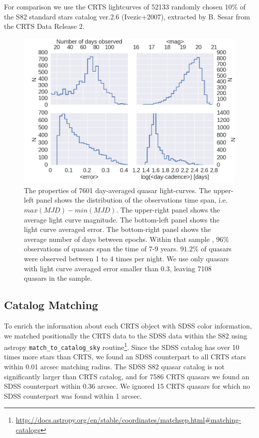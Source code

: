 \documentclass[fleqn,usenatbib]{mnras}  %
\begin{document}
For comparison we use the CRTS lightcurves of 52133 randomly chosen  10\% of the S82 standard stars catalog ver.2.6 (Ivezic+2007), extracted by B. Sesar from the CRTS Data Release 2.

\begin{figure}
\label{fig:1}
 \includegraphics[width=\columnwidth]{Fig_1_QSO_CRTS_AVG_stats_USED_data_four_panels.png}
 \caption{The properties of 7601 day-averaged quasar light-curves. The upper-left panel shows the distribution of the observations time span, i.e. $max(MJD)-min(MJD)$. The upper-right panel shows the average light curve magnitude. The bottom-left panel shows the light curve averaged error. The bottom-right panel shows the average number of days between epochs. Within that sample , $96 \% $ observations of quasars span the time of 7-9 years.  $91.2\%$ of  quasars were observed between 1 to 4 times per night. We use only quasars with light curve averaged error smaller than 0.3, leaving 7108 quasars in the sample.}
\end{figure}



\subsection{Catalog Matching}
To enrich the information about each CRTS object with SDSS color information, we matched positionally the CRTS data to the SDSS data within the S82 using astropy \verb|match_to_catalog_sky|  routine\footnote{\url{http://docs.astropy.org/en/stable/coordinates/matchsep.html\#matching-catalogs}}.  
Since the SDSS catalog has over 10 times more stars than CRTS, we found an SDSS counterpart to all  CRTS stars within 0.01 arcsec matching radius. The SDSS S82 quasar catalog is not significantly larger than CRTS catalog, and for 7586 CRTS quasars we found an SDSS counterpart within 0.36 arcsec.   We  ignored  15 CRTS quasars for which no SDSS counterpart was found within 1 arcsec.  
\end{document}
